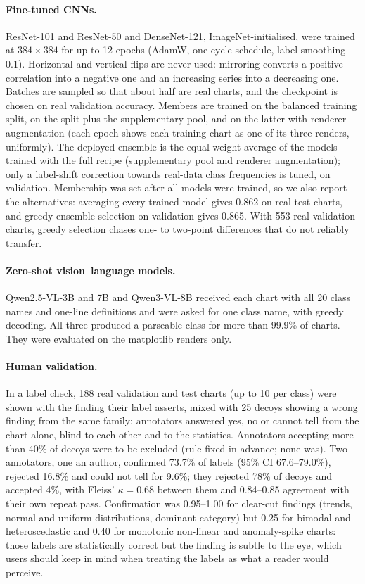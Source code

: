 \documentclass[11pt,a4paper]{article}
\begin{document}
\paragraph{Fine-tuned CNNs.} ResNet-101 and ResNet-50\cite{resnet} and
DenseNet-121\cite{densenet}, ImageNet-initialised, were trained at $384\times384$ for
up to 12 epochs (AdamW, one-cycle schedule, label smoothing 0.1). Horizontal and
vertical flips are never used: mirroring converts a positive correlation into a
negative one and an increasing series into a decreasing one. Batches are sampled so
that about half are real charts, and the checkpoint is chosen on real validation
accuracy. Members are trained on the balanced training split, on the split plus the
supplementary pool, and on the latter with renderer augmentation (each epoch shows each
training chart as one of its three renders, uniformly). The deployed ensemble is the equal-weight average of the models trained
with the full recipe (supplementary pool and renderer augmentation); only a label-shift
correction\cite{saerens} towards real-data class frequencies is tuned, on validation.
Membership was set after all models were trained, so we also report the alternatives:
averaging every trained model gives 0.862 on real test charts, and greedy ensemble
selection\cite{caruana} on validation gives 0.865. With 553 real validation charts,
greedy selection chases one- to two-point differences that do not reliably transfer.

\paragraph{Zero-shot vision--language models.} Qwen2.5-VL-3B and 7B\cite{qwen25vl} and
Qwen3-VL-8B\cite{qwen3vl} received each chart with all 20 class names and one-line
definitions and were asked for one class name, with greedy decoding. All three
produced a parseable class for more than 99.9\% of charts. They were evaluated on the
matplotlib renders only.

\paragraph{Human validation.} In a label check, 188 real validation and test charts (up to 10
per class) were shown with the finding their label asserts, mixed with 25 decoys showing a
wrong finding from the same family; annotators answered yes, no or cannot tell from the chart
alone, blind to each other and to the statistics. Annotators accepting more than 40\% of decoys
were to be excluded (rule fixed in advance; none was). Two annotators, one an author, confirmed
73.7\% of labels (95\% CI 67.6--79.0\%), rejected 16.8\% and could not tell for 9.6\%; they
rejected 78\% of decoys and accepted 4\%, with Fleiss' $\kappa=0.68$ between them and 0.84--0.85
agreement with their own repeat pass. Confirmation was 0.95--1.00 for clear-cut findings
(trends, normal and uniform distributions, dominant category) but 0.25 for bimodal and
heteroscedastic and 0.40 for monotonic non-linear and anomaly-spike charts: those labels are
statistically correct but the finding is subtle to the eye, which users should keep in mind
when treating the labels as what a reader would perceive.
\end{document}

